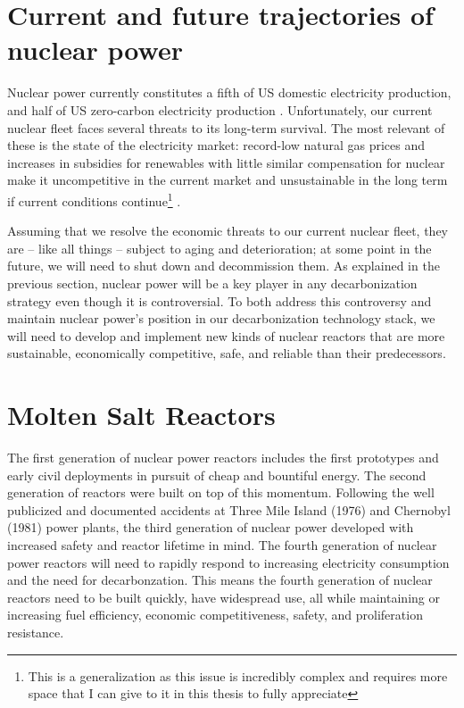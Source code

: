 \section{Current and future trajectories of nuclear power}%
\label{sec:current_and_future_trajectories_of_nuclear_power}
Nuclear power currently constitutes a fifth of US domestic electricity production, and half of US zero-carbon electricity production \cite{eia_faq_2021} \cite{doene_facts_2021}. Unfortunately, our current nuclear fleet faces several threats to its long-term survival. The most relevant of these is the state of the electricity market: record-low natural gas prices and increases in subsidies for renewables with little similar compensation for
nuclear make it uncompetitive in the current market and unsustainable in the long term if current conditions continue\footnote{This is a generalization as this issue is incredibly complex and requires more space that I can give to it in this thesis to fully appreciate} \cite{szilard_economic_2016}. %

Assuming that we resolve the economic threats to our current nuclear fleet, they are -- like all things -- subject to aging and deterioration; at some point in the future, we will need to shut down and decommission them. As explained in the previous section, nuclear power will be a key player in any decarbonization strategy even though it is controversial. To both address this controversy and maintain nuclear power's position in our decarbonization technology stack, we will need to develop and
implement new kinds of nuclear reactors that are more sustainable, economically competitive, safe, and reliable than
their predecessors.
 
\section{Molten Salt Reactors}%
\label{sec:molten_salt_reactors}

The first generation of nuclear power reactors includes the first prototypes and early civil deployments in pursuit of cheap and bountiful energy. The second generation of reactors were built on top of this momentum. Following the well publicized and documented accidents at Three Mile Island (1976) and Chernobyl (1981) power plants, the third generation of nuclear power developed with increased safety and reactor lifetime
in mind. The fourth generation of nuclear power
reactors will need to rapidly respond to increasing electricity consumption and the need for decarbonzation. This means the fourth generation of nuclear reactors need to be built quickly, have widespread use, all while maintaining or increasing fuel efficiency, economic competitiveness, safety, and proliferation resistance.


